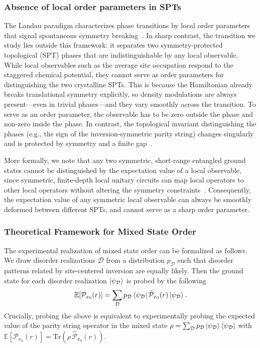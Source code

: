 \documentclass[preprint,superscriptaddress,floatfix, nofootinbib]{revtex4-2}
\begin{document}
\subsubsection*{Absence of local order parameters in SPTs}
The Landau paradigm characterizes phase transitions by local order parameters that signal spontaneous symmetry breaking~\cite{Landau1937, Beekman2019}. In sharp contrast, the transition we study lies outside this framework: it separates two symmetry-protected topological (SPT) phases that are indistinguishable by any local observable. While local observables such as the average site occupation respond to the staggered chemical potential, they cannot serve as order parameters for distinguishing the two crystalline SPTs. This is because the Hamiltonian already breaks translational symmetry explicitly, so density modulations are always present—even in trivial phases—and they vary smoothly across the transition. To serve as an order parameter, the observable has to be zero outside the phase and non-zero inside the phase. In contrast, the topological invariant distinguishing the phases (e.g., the sign of the inversion-symmetric parity string) changes singularly and is protected by symmetry and a finite gap~\cite{Fuji2015, Pollmann2012}.

More formally, we note that any two symmetric, short-range entangled ground states cannot be distinguished by the expectation value of a local observable, since symmetric, finite-depth local unitary circuits can map local operators to other local operators without altering the symmetry constraints~\cite{Chen2010, Chen2011}. Consequently, the expectation value of any symmetric local observable can always be smoothly deformed between different SPTs, and cannot serve as a sharp order parameter.

\subsubsection*{Theoretical Framework for Mixed State Order}

The experimental realization of mixed state order can be formalized as follows. We draw disorder realizations $\mathcal{D}$ from a distribution $p_{\mathcal{D}}$ such that disorder patterns related by site-centered inversion are equally likely.
%
Then the ground state for each disorder realization $\ket{\psi_{\mathcal{D}}}$ is probed by the following
\begin{equation}
    \mathbb{E}[\mathcal{P}_{x_0}(r)] = \sum_{\mathcal{D}} p_{\mathcal{D}} \bra{\psi_{\mathcal{D}}} \hat{\mathcal{P}}_{x_0}(r)\ket{\psi_{\mathcal{D}}}.
\end{equation}
Crucially, probing the above is equivalent to experimentally probing the expected value of the parity string operator in the mixed state $\rho = \sum_{\mathcal{D}} p_{\mathcal{D}} \ket{\psi_{\mathcal{D}}} \bra{\psi_{\mathcal{D}}}$ with $\mathbb{E}[\mathcal{P}_{x_0}(r)] = \text{Tr}\left( \rho\,  \hat{\mathcal{P}}_{x_0}(r)\right)$.
%
\end{document}
